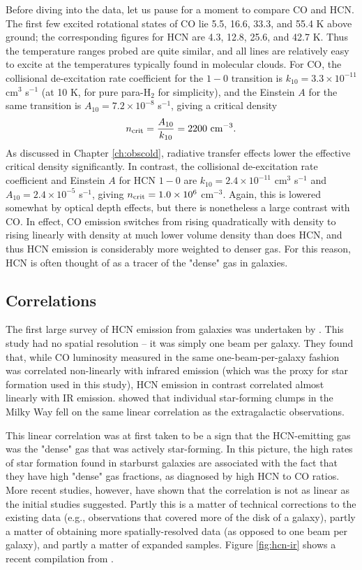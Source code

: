 Before diving into the data, let us pause for a moment to compare CO and HCN. The first few excited rotational states of CO lie 5.5, 16.6, 33.3, and 55.4 K above ground; the corresponding figures for HCN are 4.3, 12.8, 25.6, and 42.7 K. Thus the temperature ranges probed are quite similar, and all lines are relatively easy to excite at the temperatures typically found in molecular clouds. For CO, the collisional de-excitation rate coefficient for the $1-0$ transition is $k_{10} = 3.3\times 10^{-11}$ cm$^3$ s$^{-1}$ (at 10 K, for pure para-H$_2$ for simplicity), and the Einstein $A$ for the same transition is $A_{10} = 7.2\times 10^{-8}$ s$^{-1}$, giving a critical density
\begin{equation}
n_{\rm crit} = \frac{A_{10}}{k_{10}} = 2200\mbox{ cm}^{-3}.
\end{equation}
As discussed in Chapter \ref{ch:obscold}, radiative transfer effects lower the effective critical density significantly. In contrast, the collisional de-excitation rate coefficient and Einstein $A$ for HCN $1-0$ are $k_{10} = 2.4\times 10^{-11}$ cm$^3$ s$^{-1}$ and $A_{10}=2.4\times 10^{-5}$ s$^{-1}$, giving $n_{\rm crit} = 1.0\times 10^6$ cm$^{-3}$. Again, this is lowered somewhat by optical depth effects, but there is nonetheless a large contrast with CO. In effect, CO emission switches from rising quadratically with density to rising linearly with density at much lower volume density than does HCN, and thus HCN emission is considerably more weighted to denser gas. For this reason, HCN is often thought of as a tracer of the "dense" gas in galaxies.

\subsection{Correlations}

The first large survey of HCN emission from galaxies was undertaken by \citet{gao04b, gao04a}. This study had no spatial resolution -- it was simply one beam per galaxy. They found that, while CO luminosity measured in the same one-beam-per-galaxy fashion was correlated non-linearly with infrared emission (which was the proxy for star formation used in this study), HCN emission in contrast correlated almost linearly with IR emission. \citet{wu05a} showed that individual star-forming clumps in the Milky Way fell on the same linear correlation as the extragalactic observations.

This linear correlation was at first taken to be a sign that the HCN-emitting gas was the "dense" gas that was actively star-forming. In this picture, the high rates of star formation found in starburst galaxies are associated with the fact that they have high "dense" gas fractions, as diagnosed by high HCN to CO ratios. More recent studies, however, have shown that the correlation is not as linear as the initial studies suggested. Partly this is a matter of technical corrections to the existing data (e.g., observations that covered more of the disk of a galaxy), partly a matter of obtaining more spatially-resolved data (as opposed to one beam per galaxy), and partly a matter of expanded samples. Figure \ref{fig:hcn-ir} shows a recent compilation from \citet{usero15a}.


